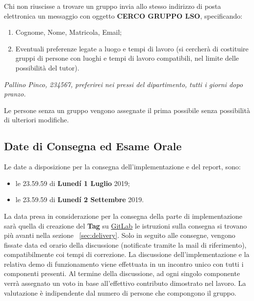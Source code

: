 Chi non riuscisse a trovare un gruppo invia allo stesso indirizzo di posta
elettronica un messaggio con oggetto \textbf{CERCO GRUPPO LSO}, specificando:

\begin{enumerate}
 \item Cognome, Nome, Matricola, Email;
 \item Eventuali preferenze legate a luogo e tempi di lavoro (si cercherà di costituire gruppi di persone con luoghi e tempi di lavoro compatibili, nel limite delle possibilità del tutor).
\end{enumerate}

\begin{tcolorbox}[colback=green!20!white,colframe=green!75!black,title=Email di esempio con oggetto \textbf{CERCO GRUPPO LSO}]
 \textit{Pallino Pinco, 234567, preferirei nei pressi del dipartimento, tutti i giorni dopo pranzo.}
\end{tcolorbox}

Le persone senza un gruppo vengono assegnate il prima possibile senza
possibilità di ulteriori modifiche.

\subsection{Date di Consegna ed Esame Orale}

Le date a disposizione per la consegna dell'implementazione e del report, sono:

\begin{itemize}
 \item le 23.59.59 di \textbf{Lunedí 1 Luglio} 2019;
 \item le 23.59.59 di \textbf{Lunedí 2 Settembre} 2019.
\end{itemize}

La data presa in considerazione per la consegna della parte di implementazione
sarà quella di creazione del \textbf{Tag} su \href{https://gitlab.com}{GitLab}
le istruzioni sulla consegna si trovano più avanti nella sezione
~\ref{sec:delivery}. Solo in seguito alle consegne, vengono fissate data ed
orario della discussione (notificate tramite la mail di riferimento),
compatibilmente coi tempi di correzione. La discussione dell'implementazione e
la relativa demo di funzionamento viene effettuata in un incontro unico con
tutti i componenti presenti. Al termine della discussione, ad ogni singolo
componente verrà assegnato un voto in base all'effettivo contributo dimostrato
nel lavoro. La valutazione è indipendente dal numero di persone che compongono
il gruppo.
